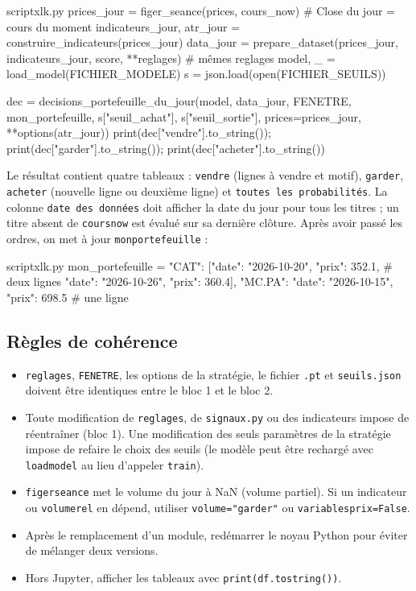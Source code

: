 \documentclass[11pt,a4paper]{article}
\renewcommand{\_}{\usorig\allowbreak}   %
\newcommand{\f}[1]{\texttt{#1}}        %
\begin{document}
\begin{code}{script\_xlk.py}
prices_jour = figer_seance(prices, cours_now)          # Close du jour = cours du moment
indicateurs_jour, atr_jour = construire_indicateurs(prices_jour)
data_jour = prepare_dataset(prices_jour, indicateurs_jour, score, **reglages)  # mêmes reglages
model, _ = load_model(FICHIER_MODELE)
s = json.load(open(FICHIER_SEUILS))

dec = decisions_portefeuille_du_jour(model, data_jour, FENETRE, mon_portefeuille,
                                     s["seuil_achat"], s["seuil_sortie"],
                                     prices=prices_jour, **options(atr_jour))
print(dec["vendre"].to_string()); print(dec["garder"].to_string()); print(dec["acheter"].to_string())
\end{code}

\noindent Le résultat contient quatre tableaux : \f{vendre} (lignes à vendre et motif),
\f{garder}, \f{acheter} (nouvelle ligne ou deuxième ligne) et \f{toutes les probabilités}.
La colonne \f{date des données} doit afficher la date du jour pour tous les titres ; un
titre absent de \f{cours\_now} est évalué sur sa dernière clôture. Après avoir passé les
ordres, on met à jour \f{mon\_portefeuille} :
\begin{code}{script\_xlk.py}
mon_portefeuille = {"CAT":   [{"date": "2026-10-20", "prix": 352.1},     # deux lignes
                              {"date": "2026-10-26", "prix": 360.4}],
                    "MC.PA": {"date": "2026-10-15", "prix": 698.5}}      # une ligne
\end{code}

\subsection{Règles de cohérence}
\begin{itemize}[nosep]
  \item \f{reglages}, \f{FENETRE}, les options de la stratégie, le fichier \f{.pt} et
  \f{seuils.json} doivent être identiques entre le bloc 1 et le bloc 2.
  \item Toute modification de \f{reglages}, de \f{signaux.py} ou des indicateurs impose de
  réentraîner (bloc 1). Une modification des seuls paramètres de la stratégie impose de
  refaire le choix des seuils (le modèle peut être rechargé avec \f{load\_model} au lieu
  d'appeler \f{train}).
  \item \f{figer\_seance} met le volume du jour à NaN (volume partiel). Si un indicateur ou
  \f{volume\_rel} en dépend, utiliser \f{volume="garder"} ou \f{variables\_prix=False}.
  \item Après le remplacement d'un module, redémarrer le noyau Python pour éviter de
  mélanger deux versions.
  \item Hors Jupyter, afficher les tableaux avec \f{print(df.to\_string())}.
\end{itemize}
\end{document}
